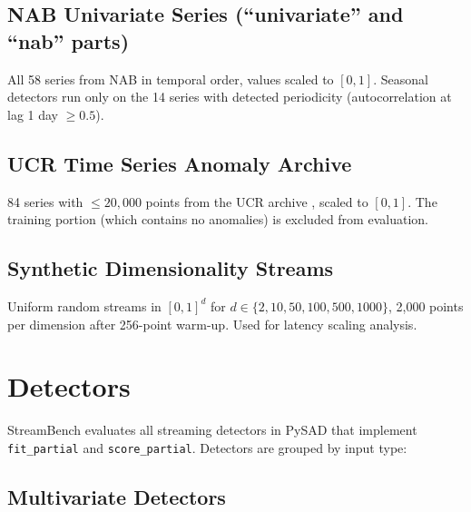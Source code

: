 \documentclass[11pt,a4paper]{article}
\begin{document}
\subsection{NAB Univariate Series (``univariate'' and ``nab'' parts)}
\label{sec:nab}

All 58 series from NAB \citep{ahmad2017unsupervised} in temporal order, values scaled to $[0,1]$. Seasonal detectors run only on the 14 series with detected periodicity (autocorrelation at lag 1 day $\ge 0.5$).

\subsection{UCR Time Series Anomaly Archive}
\label{sec:ucr}

84 series with $\le 20,000$ points from the UCR archive \citep{ucr2018}, scaled to $[0,1]$. The training portion (which contains no anomalies) is excluded from evaluation.

\subsection{Synthetic Dimensionality Streams}
\label{sec:synthetic}

Uniform random streams in $[0,1]^d$ for $d \in \{2, 10, 50, 100, 500, 1000\}$, 2,000 points per dimension after 256-point warm-up. Used for latency scaling analysis.

\section{Detectors}
\label{sec:detectors}

StreamBench evaluates all streaming detectors in PySAD that implement \texttt{fit\_partial} and \texttt{score\_partial}. Detectors are grouped by input type:

\subsection{Multivariate Detectors}
\label{sec:multivariate_detectors}
\end{document}
